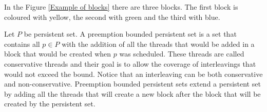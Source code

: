 In the Figure \ref{Example of blocks} there are three blocks. The first block is coloured with yellow, the second with green and the third with blue.


Let $P$ be persistent set. A preemption bounded persistent set is a set that contains all $p \in P$ with the addition of all the 
threads that would be added in a block that would be created when $p$ was scheduled. These threads are called conservative threads and their 
goal is to allow the coverage of interleavings that would not exceed the bound. Notice that an interleaving can be both conservative and non-conservative.
Preemption bounded persistent sets extend a persistent set by adding all the threads that will create a new block
after the block that will be created by the persistent set.

